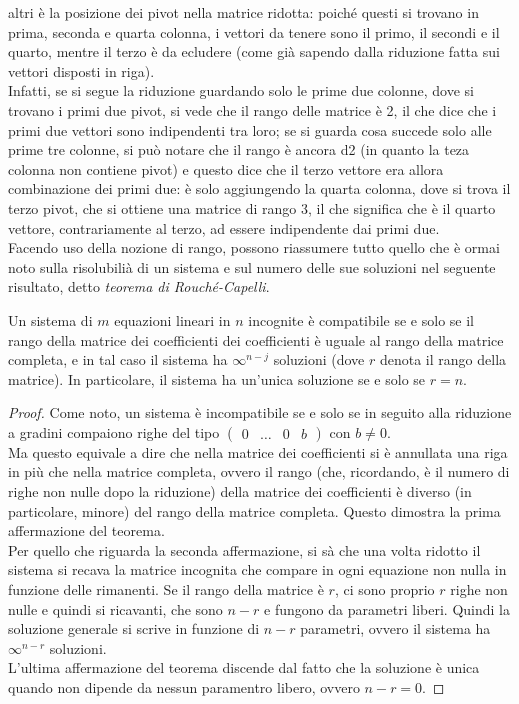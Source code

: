altri è la posizione dei pivot nella matrice ridotta: poiché questi si
trovano in prima, seconda e quarta colonna, i vettori da tenere sono il
primo, il secondi e il quarto, mentre il terzo è da ecludere (come già
sapendo dalla riduzione fatta sui vettori disposti in riga).\\
Infatti, se si segue la riduzione guardando solo le prime due colonne,
dove si trovano i primi due pivot, si vede che il rango delle matrice è
2, il che dice che i primi due vettori sono indipendenti tra loro; se
si guarda cosa succede solo alle prime tre colonne, si può notare che
il rango è ancora d2 (in quanto la teza colonna non contiene pivot) e
questo dice che il terzo vettore era allora combinazione dei primi due:
è solo aggiungendo la quarta colonna, dove si trova il terzo pivot, che
si ottiene una matrice di rango 3, il che significa che è il quarto
vettore, contrariamente al terzo, ad essere indipendente dai primi due.\\
Facendo uso della nozione di rango, possono riassumere tutto quello che
è ormai noto sulla risolubilià di un sistema e sul numero delle sue
soluzioni nel seguente risultato, detto \textit{teorema di
  Rouché-Capelli}.
\begin{teo}
  \label{teo:gauss-jordan1}
  Un sistema di $m$ equazioni lineari in $n$ incognite è compatibile se
  e solo se il rango della matrice dei coefficienti dei coefficienti è
  uguale al rango della matrice completa, e in tal caso il sistema ha
  $\infty^{n-j}$ soluzioni (dove $r$ denota il rango della matrice). In
  particolare, il sistema ha un'unica soluzione se e solo se $r=n$.
\end{teo}
\begin{proof}
  Come noto, un sistema è incompatibile se e solo se in seguito alla
  riduzione a gradini compaiono righe del tipo $
  \left(\begin{array}{ccc|c}
    0&\dots&0&b
  \end{array}\right)
  $ con $b\neq 0$.\\
  Ma questo equivale a dire che nella matrice dei coefficienti si è
  annullata una riga in più che nella matrice completa, ovvero il rango
  (che, ricordando, è il numero di righe non nulle dopo la riduzione)
  della matrice dei coefficienti è diverso (in particolare, minore) del
  rango della matrice completa. Questo dimostra la prima affermazione del
  teorema.\\
  Per quello che riguarda la seconda affermazione, si sà che una volta
  ridotto il sistema si recava la matrice incognita che compare in ogni
  equazione non nulla in funzione delle rimanenti. Se il rango della
  matrice è $r$, ci sono proprio $r$ righe non nulle e quindi si
  ricavanti, che sono $n-r$ e fungono da parametri liberi. Quindi la
  soluzione generale si scrive in funzione di $n-r$ parametri, ovvero il
  sistema ha $\infty^{n-r}$ soluzioni.\\
  L'ultima affermazione del teorema discende dal fatto che la soluzione è
  unica quando non dipende da nessun paramentro libero, ovvero $n-r=0.$
\end{proof}
